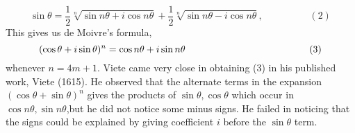 \documentclass[a4paper,reqno,11pt]{book}
\theoremstyle{plain}%
\theoremstyle{definition}
\begin{document}
$$\sin \theta = \frac{1}{2}\sqrt[n]{\sin n\theta + i\cos n\theta} + \frac{1}{2}\sqrt[n]{\sin n\theta - i\cos n\theta}, \hspace{2cm} (2) $$
This gives us de Moivre’s formula,\\
$$(\cos\theta + i\sin\theta)^n = \cos n\theta + i\sin n\theta \hspace{4.5cm} (3)$$
whenever $n = 4m+1.$ Viete came very close in obtaining (3) in his published work, Viete (1615). He observed that the alternate terms in the expansion
$(\cos \theta + \sin \theta)^n$ gives the products of $\sin \theta, \cos \theta$ which occur in $\cos n\theta, \sin n\theta$,but he did not notice some minus signs. He failed in noticing that the signs could be explained by giving coefficient $i$ before the $\sin \theta$ term.\\
\\
\end{document}
